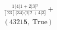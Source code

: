 \documentclass[varwidth, border=5pt]{standalone}
\begin{document}
\begin{my}
$\begin{gathered}
\scriptscriptstyle\frac{1⟨4|1+2|3]²}{[23]⟨34⟩⟨1|2+4|3]} +\\
\scriptscriptstyle(4321𝟓,\;\text{True}) \phantom{+}
\end{gathered}$
\end{my}
\end{document}
